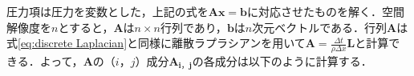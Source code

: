 \documentclass[a4j,12pt]{jreport}
\begin{document}



圧力項は圧力を変数とした，上記の式を$\bm{Ax=b}$に対応させたものを解く．空間解像度を$n$とすると，$\bm{A}$は$n \times n$行列であり，$\bm{b}$は$n$次元ベクトルである．行列$\mathbf{A}$は式\ref{eq:discrete Laplacian}と同様に離散ラプラシアンを用いて$\mathbf{A} = \frac{\varDelta t}{\rho \varDelta x}\mathbf{L}$と計算できる．よって，$\mathbf{A}$の$（i，j）$成分$\mathbf{A_{i，j}}$の各成分は以下のように計算する．
\end{document}
